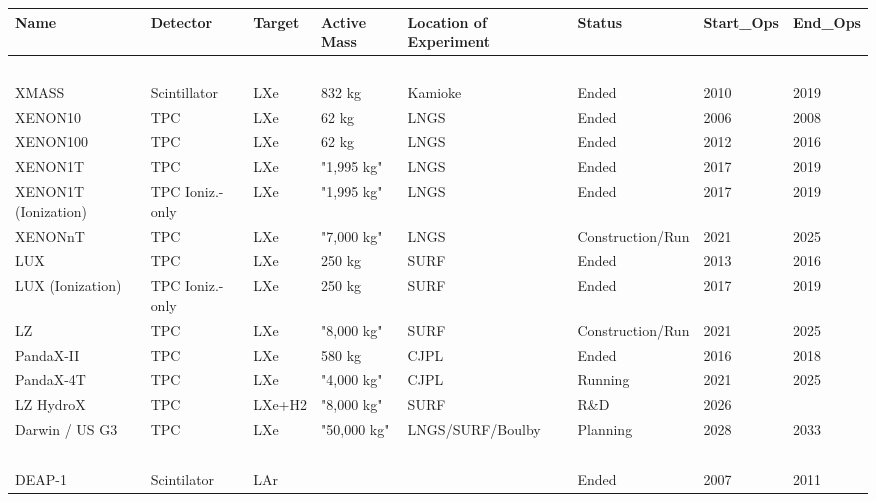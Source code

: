 %
%
%

\begin{table}[!ht]
    \centering
    \tiny
    \begin{tabular}{|l|l|l|l|l|l|l|l|}
    \hline
        Name & Detector & Target & Active Mass & Location of Experiment & Status & Start\_Ops & End\_Ops \\ \hline
        ~ & ~ & ~ & ~ & ~ & ~ & ~ & ~ \\ \hline
        XMASS & Scintillator & LXe & 832 kg & Kamioke & Ended & 2010 & 2019 \\ \hline
        XENON10 & TPC & LXe & 62 kg & LNGS & Ended & 2006 & 2008 \\ \hline
        XENON100 & TPC & LXe & 62 kg & LNGS & Ended & 2012 & 2016 \\ \hline
        XENON1T & TPC & LXe & "1,995 kg" & LNGS & Ended & 2017 & 2019 \\ \hline
        XENON1T (Ionization) & TPC Ioniz.-only & LXe & "1,995 kg" & LNGS & Ended & 2017 & 2019 \\ \hline
        XENONnT & TPC & LXe & "7,000 kg" & LNGS & Construction/Run & 2021 & 2025 \\ \hline
        LUX & TPC & LXe & 250 kg & SURF & Ended & 2013 & 2016 \\ \hline
        LUX (Ionization) & TPC Ioniz.-only & LXe & 250 kg & SURF & Ended & 2017 & 2019 \\ \hline
        LZ & TPC & LXe & "8,000 kg" & SURF & Construction/Run & 2021 & 2025 \\ \hline
        PandaX-II & TPC & LXe & 580 kg & CJPL & Ended & 2016 & 2018 \\ \hline
        PandaX-4T & TPC & LXe & "4,000 kg" & CJPL & Running & 2021 & 2025 \\ \hline
        LZ HydroX & TPC & LXe+H2 & "8,000 kg" & SURF & R\&D & 2026 & ~ \\ \hline
        Darwin / US G3 & TPC & LXe & "50,000 kg" & LNGS/SURF/Boulby & Planning & 2028 & 2033 \\ \hline
        ~ & ~ & ~ & ~ & ~ & ~ & ~ & ~ \\ \hline
        DEAP-1 & Scintilator & LAr & ~ & ~ & Ended & 2007 & 2011 \\ \hline

\end{tabular}
\end{table}
